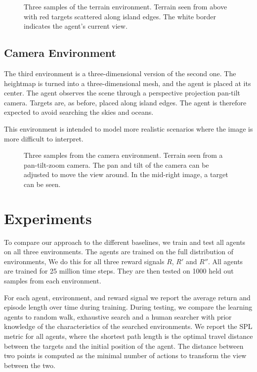 \begin{figure}
    \centering
    
    \label{fig:terrain}
    \caption[Terrain environment]{Three samples of the terrain environment. Terrain seen from above with red targets scattered along island edges. The white border indicates the agent's current view.}
\end{figure}

\subsection{Camera Environment}

The third environment is a three-dimensional version of the second one.
The heightmap is turned into a three-dimensional mesh, and the agent is placed at its center.
The agent observes the scene through a perspective projection pan-tilt camera.
Targets are, as before, placed along island edges.
The agent is therefore expected to avoid searching the skies and oceans.

This environment is intended to model more realistic scenarios where the image is more difficult to interpret.

\begin{figure}
    \centering
    
    \label{fig:camera}
    \caption[Camera environment]{Three samples from the camera environment. Terrain seen from a pan-tilt-zoom camera. The pan and tilt of the camera can be adjusted to move the view around. In the mid-right image, a target can be seen.}
\end{figure}

\section{Experiments}
\label{sec:experiments}

To compare our approach to the different baselines,
we train and test all agents on all three environments.
The agents are trained on the full distribution of environments,
We do this for all three reward signals \(R\), \(R'\) and \(R''\).
All agents are trained for 25 million time steps.
They are then tested on 1000 held out samples from each environment.

For each agent, environment, and reward signal we report the average return and episode length over time during training.
During testing, we compare the learning agents to random walk, exhaustive search and a human searcher with prior knowledge of the characteristics of the searched environments.
We report the SPL metric for all agents, where the shortest path length is the optimal travel distance between the targets and the initial position of the agent.
The distance between two points is computed as the minimal number of actions to transform the view between the two.

